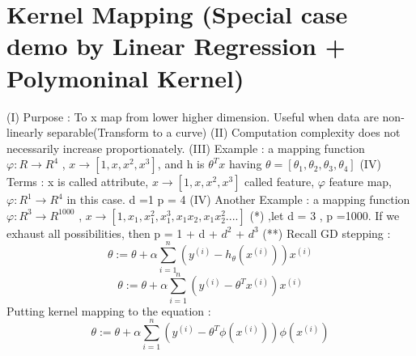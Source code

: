 \documentclass{article}
\begin{document}
\section{Kernel Mapping (Special case demo by Linear Regression + Polymoninal Kernel)}
(I) Purpose : To x map from lower higher dimension. Useful when data are non-linearly separable(Transform to a curve) 
\newline
(II) Computation complexity does not necessarily increase proportionately.
\newline
(III) Example : a mapping function \(\varphi : R \to R^{4}\) , \(x \to [1,x,x^{2},x^{3}]\), and h is \(\theta^{T}x\) having  \(\theta  = [\theta_1,\theta_2,\theta_3,\theta_4]\) 
\newline
(IV) Terms : x is called attribute, \(x \to [1,x,x^{2},x^{3}]\) called feature, \(\varphi\) feature map, \(\varphi : R^{1} \to R^{4}\) in this case. d =1 p = 4 
\newline
(IV) Another Example : a mapping function \(\varphi : R^{3} \to R^{1000}\) , \(x \to [1,x_1,x_1^{2},x_1^{3},x_1 x_2,x_1 x_2^{2} .... ]\) (*) ,let d  = 3 , p =1000. If we exhaust all possibilities, then p = 1 + d + \(d^2\) + \(d^3\)  (**) 
\newline
Recall GD stepping  : 
\[\theta := \theta + \alpha \sum_{i=1}^{n} (y^{(i)} - h_{\theta}(x^{(i)}))x^{(i)}\]
\[\theta := \theta + \alpha \sum_{i=1}^{n} (y^{(i)} - \theta^Tx^{(i)})x^{(i)}\]
Putting kernel mapping to the equation :
\[\theta := \theta + \alpha \sum_{i=1}^{n} (y^{(i)} - \theta^T\phi(x^{(i)}))\phi(x^{(i)})\]
\end{document}
